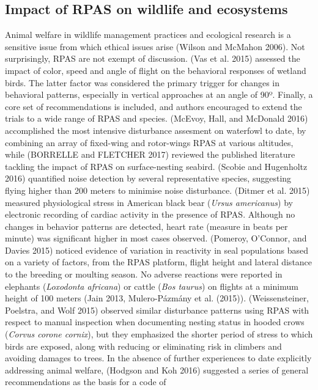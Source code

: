 \documentclass[]{interact}
\theoremstyle{plain}%
\theoremstyle{definition}
\theoremstyle{remark}
\begin{document}
\subsection{Impact of RPAS on wildlife and
ecosystems}\label{impact-of-rpas-on-wildlife-and-ecosystems}

Animal welfare in wildlife management practices and ecological research
is a sensitive issue from which ethical issues arise (Wilson and McMahon
2006). Not surprisingly, RPAS are not exempt of discussion. (Vas et al.
2015) assessed the impact of color, speed and angle of flight on the
behavioral responses of wetland birds. The latter factor was considered
the primary trigger for changes in behavioral patterns, especially in
vertical approaches at an angle of 90º. Finally, a core set of
recommendations is included, and authors encouraged to extend the trials
to a wide range of RPAS and species. (McEvoy, Hall, and McDonald 2016)
accomplished the most intensive disturbance assesment on waterfowl to
date, by combining an array of fixed-wing and rotor-wings RPAS at
various altitudes, while (BORRELLE and FLETCHER 2017) reviewed the
published literature tackling the impact of RPAS on surface-nesting
seabird. (Scobie and Hugenholtz 2016) quantified noise detection by
several representative species, suggesting flying higher than 200 meters
to minimise noise disturbance. (Ditmer et al. 2015) measured
physiological stress in American black bear (\emph{Ursus americanus}) by
electronic recording of cardiac activity in the presence of RPAS.
Although no changes in behavior patterns are detected, heart rate
(measure in beats per minute) was significant higher in most cases
observed. (Pomeroy, O'Connor, and Davies 2015) noticed evidence of
variation in reactivity in seal populations based on a variety of
factors, from the RPAS platform, flight height and lateral distance to
the breeding or moulting season. No adverse reactions were reported in
elephants (\emph{Loxodonta africana}) or cattle (\emph{Bos taurus}) on
flights at a minimum height of 100 meters (Jain 2013, Mulero-Pázmány et
al. (2015)). (Weissensteiner, Poelstra, and Wolf 2015) observed similar
disturbance patterns using RPAS with respect to manual inspection when
documenting nesting status in hooded crows (\emph{Corvus corone
cornix}), but they emphasized the shorter period of stress to which
birds are exposed, along with reducing or eliminating risk in climbers
and avoiding damages to trees. In the absence of further experiences to
date explicitly addressing animal welfare, (Hodgson and Koh 2016)
suggested a series of general recommendations as the basis for a code of
\end{document}

